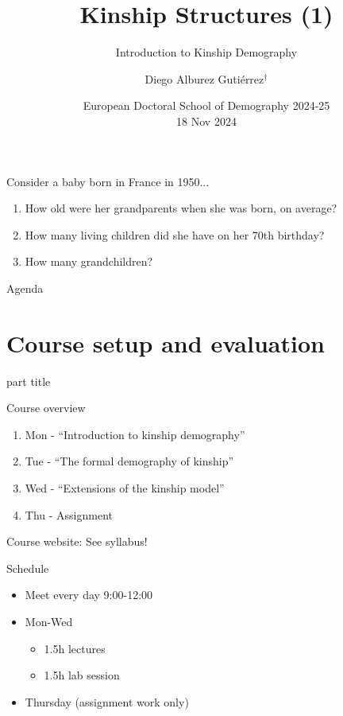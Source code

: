 ﻿\documentclass{beamer}
\title[Kinship]{Kinship Structures (1)}
\subtitle{Introduction to Kinship Demography}
\author{Diego Alburez Guti\'errez$^{\dagger}$}
\institute{$^{\dagger}$Kinship Inequalities Research Group, \\ Max Planck Institute for Demographic Research }
\date{European Doctoral School of Demography 2024-25 \\ 18 Nov 2024}
\begin{document}
 \begin{frame}[t,plain]
 \titlepage
 \end{frame}
 
 \begin{frame}{Consider a  baby born in France in 1950...}
     \begin{enumerate}
         \item How old were her grandparents when she was born, on average?
         \item How many living children did she have on her 70th birthday?
         \item How many grandchildren?
     \end{enumerate}
 \end{frame}

 \begin{frame}{Agenda}
\tableofcontents
\end{frame}

\section{Course setup and evaluation}
\begin{frame}
    \begin{centering}
    \begin{beamercolorbox}[sep=12pt,center]{part title}
    \insertsection\par
    \end{beamercolorbox}
    \end{centering}
\end{frame}

\begin{frame}{Course overview}

\begin{enumerate}
    \item Mon - ``Introduction to kinship demography''
    \item Tue - ``The formal demography of kinship''
    \item Wed - ``Extensions of the kinship model''
    \item Thu - Assignment
\end{enumerate}

\vspace{1cm}

Course website: See syllabus!
    
\end{frame}

\begin{frame}{Schedule}

\begin{itemize}
    \item Meet every day 9:00-12:00 
    \item Mon-Wed
    \begin{itemize}
        \item 1.5h lectures
        \item 1.5h lab session
    \end{itemize}
    \item Thursday (assignment work only)
\end{itemize}

\end{frame}
\end{document}
